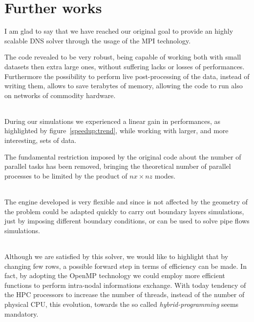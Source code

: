 \chapter{Further works}
I am glad to say that we have reached our original goal to provide an highly scalable DNS solver through the usage of the MPI technology. \par
The code revealed to be very robust, being capable of working both with small datasets then extra large ones, without suffering lacks or losses of performances.
Furthermore the possibility to perform live post-processing of the data, instead of writing them, allows to save terabytes of memory, allowing the code to run also on networks of commodity hardware. \\~\par
During our simulations we experienced a linear gain in performances, as highlighted by figure~\ref{speedup:trend}, while working with larger, and more interesting, sets of data. \par
The fundamental restriction imposed by the original code about the number of parallel tasks has been removed, bringing the theoretical number of parallel processes to be limited by the product of $nx \times nz$ modes. \\~\par
The engine developed is very flexible and since is not affected by the geometry of the problem could be adapted quickly to carry out boundary layers simulations, just by imposing different boundary conditions, or can be used to solve pipe flows simulations.\\~\par
Although we are satisfied by this solver, we would like to highlight that by changing few rows, a possible forward step in terms of efficiency can be made.
In fact, by adopting the OpenMP technology we could employ more efficient functions to perform intra-nodal informations exchange. With today tendency of the HPC processors to increase the number of threads, instead of the number of physical CPU, this evolution, towards the so called \emph{hybrid-programming} seems mandatory.
